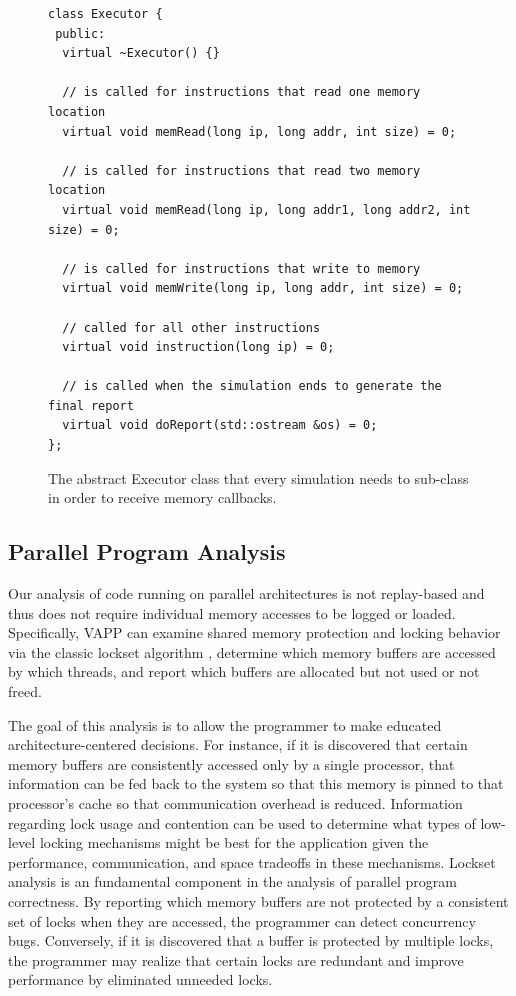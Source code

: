 \begin{figure}
  \lstset{
    language=C++,
    basicstyle=\small,
  }
  \begin{lstlisting}
class Executor {
 public:
  virtual ~Executor() {}

  // is called for instructions that read one memory location
  virtual void memRead(long ip, long addr, int size) = 0;

  // is called for instructions that read two memory location
  virtual void memRead(long ip, long addr1, long addr2, int size) = 0;

  // is called for instructions that write to memory
  virtual void memWrite(long ip, long addr, int size) = 0;

  // called for all other instructions
  virtual void instruction(long ip) = 0;

  // is called when the simulation ends to generate the final report
  virtual void doReport(std::ostream &os) = 0;
};
  \end{lstlisting}
  \caption{The abstract Executor class that every simulation needs to
    sub-class in order to receive memory callbacks.}
  \label{fig:executor}
\end{figure}

\subsection{Parallel Program Analysis}
\label{sec:ppa}
Our analysis of code running on parallel architectures is
not replay-based and thus does not require individual memory
accesses to be logged or loaded.  Specifically, VAPP can
examine shared memory protection and locking behavior via
the classic lockset algorithm \cite{savage1997eraser},
determine which memory buffers are accessed by which threads,
and report which buffers are allocated but not used or not freed.

The goal of this analysis is to allow the programmer to make
educated architecture-centered decisions.  For instance, if
it is discovered that certain memory buffers are consistently
accessed only by a single processor, that information can be
fed back to the system so that this memory is pinned to that
processor's cache so that communication overhead is reduced.
Information regarding lock usage and contention can be
used to determine what types of low-level locking mechanisms
might be best for the application given the performance, 
communication, and space tradeoffs in these mechanisms.
Lockset analysis is an fundamental component in the analysis
of parallel program correctness. By reporting which
memory buffers are not protected by a consistent set of locks
when they are accessed, the programmer can detect concurrency
bugs. Conversely, if it is discovered that a buffer is
protected by multiple locks, the programmer may realize that
certain locks are redundant and improve performance by eliminated
unneeded locks.

